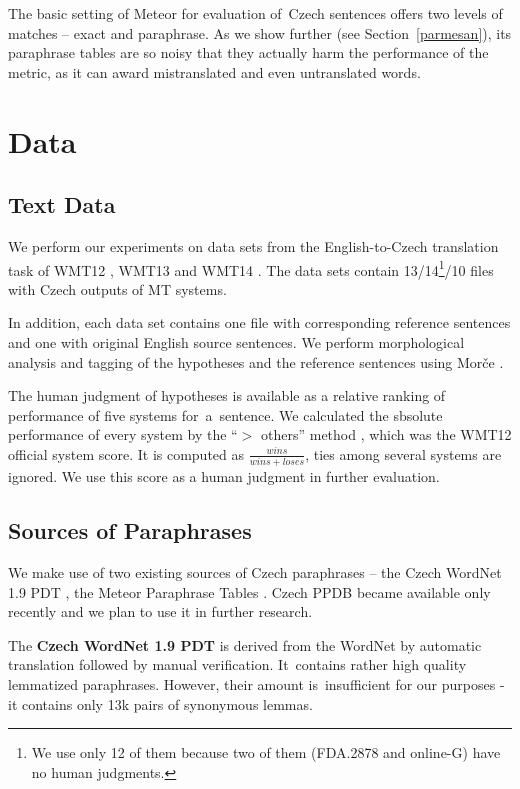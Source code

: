 \documentclass[11pt]{article}
\def\Tref#1{Table~\ref{#1}}
\def\Sref#1{Section~\ref{#1}}
\begin{document}
The basic setting of Meteor for evaluation of~Czech sentences offers two levels 
of matches -- exact and paraphrase. As we show further (see \Sref{parmesan}), 
its paraphrase tables are so noisy that they actually harm the performance of 
the metric, as it can award mistranslated and even untranslated words.


\section{Data}
\label{Data}
\subsection{Text Data}
We perform our experiments on data sets from the English-to-Czech translation 
task of WMT12 \cite{wmt12}, WMT13 \cite{wmt13} and WMT14 \cite{wmt14}. The data
sets contain 13/14\footnote{We use only 12 of them because two of them 
(FDA.2878 and online-G) have no human judgments.}/10 files with Czech outputs 
of MT systems.

In addition, each data set contains one file with corresponding reference 
sentences and one with original English source sentences. We perform 
morphological analysis and tagging of the hypotheses and the reference 
sentences using Morče \cite{morce:2007}.

The human judgment of hypotheses is available as a relative ranking of 
performance of five systems for~a~sentence. We calculated the sbsolute 
performance of every system by the “$ > $ others” method \cite{bojar-grains}, 
which was the WMT12 official system score. It is computed as 
$ \frac{wins}{wins+loses} $, ties among several systems are ignored. We use 
this score as a human judgment in further evaluation.

\subsection{Sources of Paraphrases}
\label{meteori}
We make use of two existing sources of Czech paraphrases -- the Czech WordNet 
1.9 PDT \cite{czech-wordnet}, the Meteor Paraphrase Tables \cite{meteor-tables}. 
Czech PPDB \cite{ppdb} became available only recently and we plan to use it in 
further research.

The \textbf{Czech WordNet 1.9 PDT} is derived from the WordNet \cite{wordnet} 
by automatic translation followed by manual verification. It~contains rather 
high quality lemmatized paraphrases. However, their amount is~insufficient for 
our purposes - it contains only 13k pairs of synonymous lemmas. %
\end{document}

